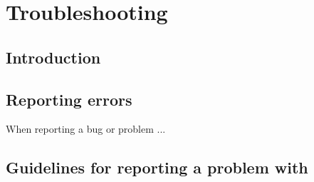 \section{Troubleshooting\label{sec:trouble-shooting}}

\subsection{Introduction}

\subsection{Reporting errors\label{sec:reporting-errors}}

When reporting a bug or problem ...

\subsection{Guidelines for reporting a problem with \CNAME\label{sec:error-guidelines}}

